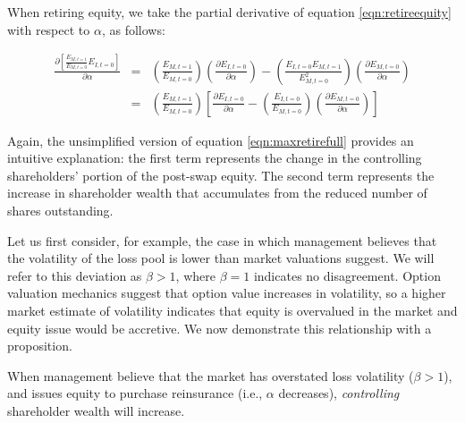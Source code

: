 When retiring equity, we take the partial derivative of equation \ref{eqn:retireequity} with respect to $\alpha$, as follows:

\begin{eqnarray}\label{eqn:maxretirefull}
\frac{\partial
\displaystyle\left[\frac{E_{M,t=1}}{E_{M,t=0}}E_{I,t=0}\right]}{\partial\alpha}&=&\left( \frac{E_{M,t=1}}{E_{M,t=0}}\right)\left(\frac{\partial E_{I,t=0}}{\partial \alpha}\right)-\left(\frac{E_{I,t=0}E_{M,t=1}}{E^2_{M,t=0}}\right)\left(\frac{\partial E_{M,t=0}}{\partial \alpha}\right)\nonumber\\
&=&\left(\frac{E_{M,t=1}}{E_{M,t=0}}\right)\left[\frac{\partial E_{I,t=0}}{\partial \alpha}-\left(\frac{E_{I,t=0}}{E_{M,t=0}}\right)\left(\frac{\partial E_{M,t=0}}{\partial \alpha}\right)\right]
\end{eqnarray}

Again, the unsimplified version of equation \ref{eqn:maxretirefull} provides an intuitive explanation: the first term represents the change in the controlling shareholders' portion of the post-swap equity. The second term represents the increase in shareholder wealth that accumulates from the reduced number of shares outstanding.

Let us first consider, for example, the case in which management believes that the volatility of the loss pool is lower than market valuations suggest.  We will refer to this deviation as $\beta>1$, where $\beta=1$ indicates no disagreement.  Option valuation mechanics suggest that option value increases in volatility, so a higher market estimate of volatility indicates that equity is overvalued in the market and equity issue would be accretive.  We now demonstrate this relationship with a proposition.

\begin{proposition}
When management believe that the market has overstated loss volatility ($\beta>1$), and issues equity to purchase reinsurance (i.e., $\alpha$ decreases), \textit{controlling} shareholder wealth will increase.
\end{proposition}

